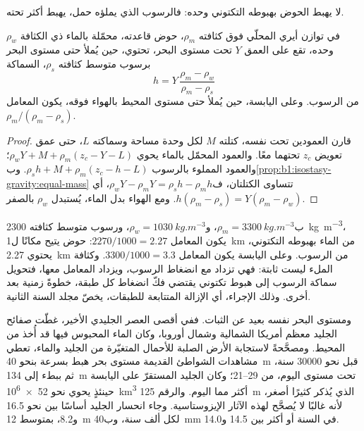 لا يهبط الحوض بهبوطه التكتوني وحده: فالرسوب الذي يملؤه حمل،  يهبط أكثر تحته.

\begin{proposition}\label{prop:b1:diagenesis-basins:loading}
في توازن أيري المحلّي فوق  كثافته $\rho_m$، حوض قاعدته، محمّلة بالماء ذي الكثافة $\rho_w$ وحده، تقع على العمق $Y$ تحت مستوى البحر، تحتوي، حين يُملأ حتى مستوى البحر برسوب متوسط كثافته $\rho_s$، السماكة
\[
  h = Y\,\frac{\rho_m - \rho_w}{\rho_m - \rho_s}
\]
من الرسوب. وعلى اليابسة، حين يُملأ حتى مستوى المحيط بالهواء فوقه، يكون المعامل $\rho_m/(\rho_m - \rho_s)$.
\end{proposition}

\begin{proof}
قارن العمودين تحت  نفسه، كتلته $M$ لكل وحدة مساحة وسماكته $L$، حتى عمق تعويض $z_c$ تحتهما معًا. والعمود المحمّل بالماء يحوي $\rho_w Y + M + \rho_m(z_c - Y - L)$؛ والعمود المملوء بالرسوب $\rho_s h + M + \rho_m(z_c - h - L)$. وب\cref{prop:b1:isostasy-gravity:equal-mass} تتساوى الكتلتان، ف$\rho_w Y - \rho_m Y = \rho_s h - \rho_m h$، أي $h(\rho_m - \rho_s) =
Y(\rho_m - \rho_w)$. ومع الهواء بدل الماء، يُستبدل $\rho_w$ بالصفر.
\end{proof}

ب$\rho_m = \qty{3300}{kg.m^{-3}}$، و$\rho_w = \qty{1030}{kg.m^{-3}}$، ورسوب متوسط كثافته \qty{2300}{kg.m^{-3}}، يكون المعامل $2270/1000 = \num{2.27}$: حوض يتيح مكانًا ل\qty{1}{km} من الماء بهبوطه التكتوني، يحتوي \qty{2.27}{km} من الرسوب. وعلى اليابسة يكون المعامل $3300/1000 = \num{3.3}$. وكثافة الملء ليست ثابتة: فهي تزداد مع انضغاط الرسوب، ويزداد المعامل معها، فتحويل سماكة الرسوب إلى هبوط تكتوني يقتضي فكّ انضغاط كل طبقة، خطوةً زمنية بعد أخرى. وذلك الإجراء، أي الإزالة المتتابعة للطبقات، يخصّ مجلد السنة الثانية.

ومستوى البحر نفسه بعيد عن الثبات. ففي أقصى العصر الجليدي الأخير، غطّت صفائح الجليد معظم أمريكا الشمالية وشمال أوروبا، وكان الماء المحبوس فيها قد أُخذ من المحيط. ومصحَّحةً لاستجابة الأرض الصلبة للأحمال المتغيّرة من الجليد والماء، تعطي مشاهدات الشواطئ القديمة مستوى بحر هبط بسرعة بنحو \qty{40}{m} قبل نحو \num{30000} سنة، ثم ببطء إلى \qty{134}{m} تحت مستوى اليوم، من \qtyrange{29}{21}{\ka}؛ وكان الجليد المستقرّ على اليابسة حينئذٍ يحوي نحو \qty{52e6}{km^3} أكثر مما اليوم. والرقم \qty{125}{m} الذي يُذكر كثيرًا أصغر، لأنه غالبًا لا يُصحَّح لهذه الآثار الإيزوستاسية. وجاء انحسار الجليد أساسًا بين نحو \qty{16.5}{\ka} و\qty{8.2}{\ka}، بمتوسط \qty{12}{m} لكل ألف سنة، وب\qty{40}{mm} في السنة أو أكثر بين \qty{14.5}{\ka} و\qty{14.0}{\ka}.

